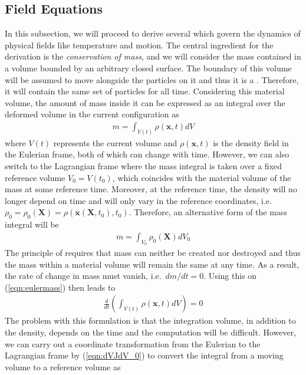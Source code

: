 \subsection{Field Equations}
In this subsection, we will proceed to derive several  which govern the dynamics of physical fields like temperature and motion. The central ingredient for the derivation is the \textit{conservation of mass}, and we will consider the mass contained in a volume bounded by an arbitrary closed surface. The boundary of this volume will be assumed to move alongside the particles on it and thus it is a . Therefore, it will contain the same set of particles for all time. Considering this material volume, the amount of mass inside it can be expressed as an integral over the deformed volume in the current configuration as
\begin{align}
m = \int_{V(t)} \rho(\textbf{x},t) dV \label{eqn:eulermass}
\end{align}
where $V(t)$ represents the current volume and $\rho(\textbf{x},t)$ is the density field in the Eulerian frame, both of which can change with time. However, we can also switch to the Lagrangian frame where the mass integral is taken over a fixed reference volume $V_0 = V(t_0)$, which coincides with the material volume of the mass at some reference time. Moreover, at the reference time, the density will no longer depend on time and will only vary in the reference coordinates, i.e.\ $\rho_0 = \rho_0(\textbf{X}) = \rho(\textbf{x}(\textbf{X},t_0), t_0)$. Therefore, an alternative form of the mass integral will be
\begin{align}
m = \int_{V_0} \rho_0(\textbf{X}) dV_0 \label{eqn:lagmass}
\end{align}
The principle of  requires that mass can neither be created nor destroyed and thus the mass within a material volume will remain the same at any time. As a result, the rate of change in mass must vanish, i.e.\ $dm/dt = 0$. Using this on (\ref{eqn:eulermass}) then leads to
\begin{align}
\frac{d}{dt}\left(\int_{V(t)} \rho(\textbf{x},t) dV\right) = 0
\end{align}
The problem with this formulation is that the integration volume, in addition to the density, depends on the time and the computation will be difficult. However, we can carry out a coordinate transformation from the Eulerian to the Lagrangian frame by (\ref{eqn:dVJdV_0}) to convert the integral from a moving volume to a reference volume as
